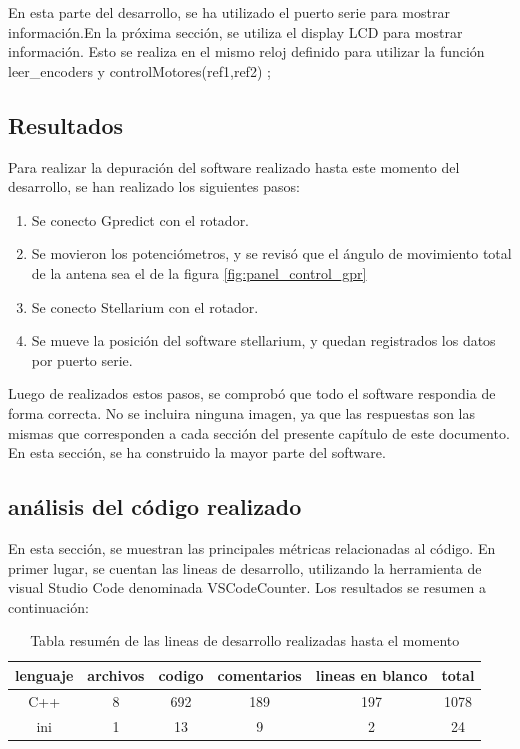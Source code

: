 En esta parte del desarrollo, se ha utilizado el puerto serie para mostrar información.En la próxima sección, se utiliza el display LCD para mostrar información. Esto se realiza en el mismo reloj definido para utilizar la función leer\_encoders y controlMotores(ref1,ref2) ; 

\subsection{Resultados}
Para realizar la depuración del software realizado hasta este momento del desarrollo, se han realizado los siguientes pasos: 
\begin{enumerate}
	\item Se conecto Gpredict con el rotador. 
	\item Se movieron los potenciómetros, y se revisó que el ángulo de movimiento total de la antena sea el de la figura \ref{fig:panel_control_gpr}
	\item Se conecto Stellarium con el rotador.
	\item Se mueve la posición del software stellarium, y quedan registrados los datos por puerto serie.
\end{enumerate}


Luego de realizados estos pasos, se comprobó que todo el software respondia de forma correcta. No se incluira ninguna imagen, ya que las respuestas son las mismas que corresponden a cada sección del presente capítulo de este documento. En esta sección, se ha construido la mayor parte del software. 


\subsection{análisis del código realizado}

En esta sección, se muestran las principales métricas relacionadas al código. 
En primer lugar, se cuentan las lineas de desarrollo, utilizando la herramienta de visual Studio Code denominada VSCodeCounter. Los resultados se resumen a continuación: 
\begin{table}[ht]
	\centering
	\begin{tabular}{|c|c|c|c|c|c|}
		\hline 
		lenguaje& archivos & codigo & comentarios & lineas en blanco & total \\ 
		\hline 
		C++ & 8 &692 &189 &197 & 1078 \\
		\hline 
		ini &1 &13 &9 &2&24\\
		\hline
	\end{tabular}
\caption{Tabla resumén de las lineas de desarrollo realizadas hasta el momento}
\end{table}

